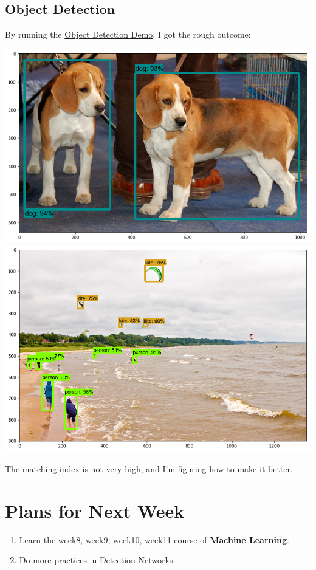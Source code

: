 \documentclass{article}
\begin{document}
\subsection{Object Detection}
By running the \href{https://github.com/tensorflow/models/blob/master/research/object_detection/object_detection_tutorial.ipynb}{Object Detection Demo}, I got the rough outcome:
\begin{center}
\includegraphics[scale=0.5]{index.png}
\includegraphics[scale=0.5]{index1.png}
\end{center}
The matching index is not very high, and I'm figuring how to make it better.

\section{Plans for Next Week}
\begin{enumerate}
  \item Learn the week8, week9, week10, week11 course of \textbf{Machine Learning}.
  \item Do more practices in Detection Networks.
\end{enumerate}
\end{document}
